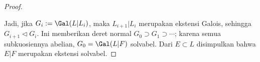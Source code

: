 \begin{proof}
\begin{compactdesc}
	\end{compactdesc}
	Jadi, jika $G_i := \Gal(L|L_i)$, maka $L_{i+1}|L_i$ merupakan ekstensi Galois, sehingga $G_{i+1} \lhd G_i$. Ini memberikan deret normal $G_0 \supset G_1 \supset \cdots$; karena semua subkuosiennya abelian, $G_0 = \Gal(L|F)$ solvabel. Dari $E \subset L$ disimpulkan bahwa $E|F$ merupakan ekstensi solvabel.
	

\end{proof}
